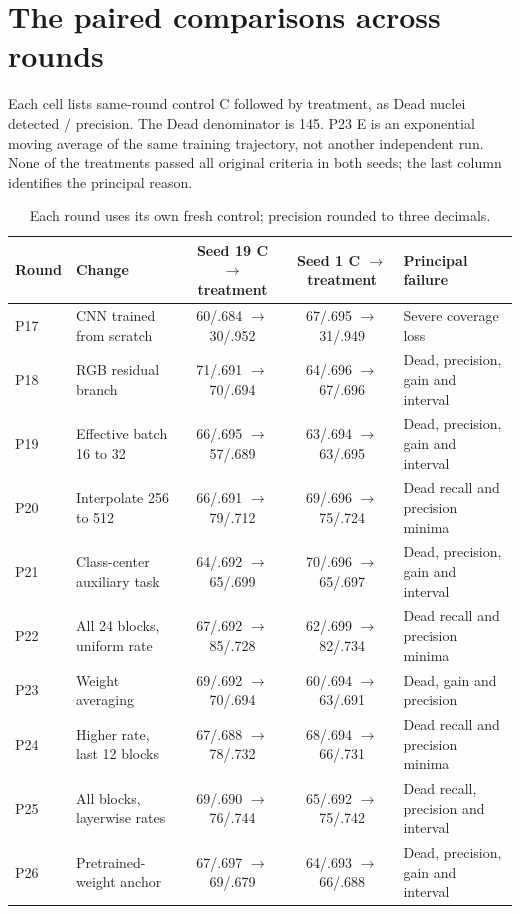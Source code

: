 \appendix
\section{The paired comparisons across rounds}
Each cell lists same-round control C followed by treatment, as Dead nuclei detected / precision. The Dead denominator is 145. P23 E is an exponential moving average of the same training trajectory, not another independent run. None of the treatments passed all original criteria in both seeds; the last column identifies the principal reason.
\begin{table}[H]\centering\small\begin{tabularx}{\linewidth}{lXccX}\toprule
Round & Change & Seed 19 C $\to$ treatment & Seed 1 C $\to$ treatment & Principal failure\\\midrule
P17 & CNN trained from scratch & 60/.684 $\to$ 30/.952 & 67/.695 $\to$ 31/.949 & Severe coverage loss\\
P18 & RGB residual branch & 71/.691 $\to$ 70/.694 & 64/.696 $\to$ 67/.696 & Dead, precision, gain and interval\\
P19 & Effective batch 16 to 32 & 66/.695 $\to$ 57/.689 & 63/.694 $\to$ 63/.695 & Dead, precision, gain and interval\\
P20 & Interpolate 256 to 512 & 66/.691 $\to$ 79/.712 & 69/.696 $\to$ 75/.724 & Dead recall and precision minima\\
P21 & Class-center auxiliary task & 64/.692 $\to$ 65/.699 & 70/.696 $\to$ 65/.697 & Dead, precision, gain and interval\\
P22 & All 24 blocks, uniform rate & 67/.692 $\to$ 85/.728 & 62/.699 $\to$ 82/.734 & Dead recall and precision minima\\
P23 & Weight averaging & 69/.692 $\to$ 70/.694 & 60/.694 $\to$ 63/.691 & Dead, gain and precision\\
P24 & Higher rate, last 12 blocks & 67/.688 $\to$ 78/.732 & 68/.694 $\to$ 66/.731 & Dead recall and precision minima\\
P25 & All blocks, layerwise rates & 69/.690 $\to$ 76/.744 & 65/.692 $\to$ 75/.742 & Dead recall, precision and interval\\P26 & Pretrained-weight anchor & 67/.697 $\to$ 69/.679 & 64/.693 $\to$ 66/.688 & Dead, precision, gain and interval\\\bottomrule
\end{tabularx}\caption{Each round uses its own fresh control; precision rounded to three decimals.}\end{table}


